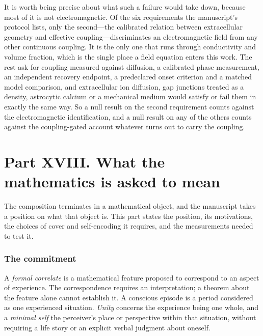 \documentclass[11pt]{article}
\begin{document}
It is worth being precise about what such a failure would take down, because
most of it is not electromagnetic. Of the six requirements the manuscript's
protocol lists, only the second---the calibrated relation between extracellular
geometry and effective coupling---discriminates an electromagnetic field from
any other continuous coupling. It is the only one that runs through
conductivity and volume fraction, which is the single place a field equation
enters this work. The rest ask for coupling measured against diffusion, a
calibrated phase measurement, an independent recovery endpoint, a predeclared
onset criterion and a matched model comparison, and extracellular ion
diffusion, gap junctions treated as a density, astrocytic calcium or a
mechanical medium would satisfy or fail them in exactly the same way. So a null
result on the second requirement counts against the electromagnetic
identification, and a null result on any of the others counts against the
coupling-gated account whatever turns out to carry the coupling.

\part*{Part XVIII. What the mathematics is asked to mean}

The composition terminates in a mathematical object, and the manuscript takes a
position on what that object is. This part states the position, its motivations,
the choices of cover and self-encoding it requires, and the measurements needed
to test it.

\section{The commitment}

A \emph{formal correlate} is a mathematical feature proposed to correspond
to an aspect of experience. The correspondence requires an interpretation;
a theorem about the feature alone cannot establish it. A conscious episode
is a period considered as one experienced situation. \emph{Unity} concerns
the experience being one whole, and a \emph{minimal self} the perceiver's
place or perspective within that situation, without requiring a life story
or an explicit verbal judgment about oneself.
\end{document}
